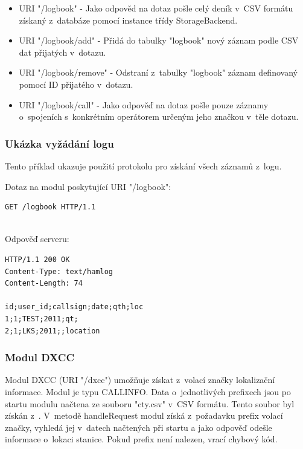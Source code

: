 \begin{itemize}
\item URI "/logbook" - Jako odpověd na dotaz pošle celý deník %
v~CSV formátu získaný z~databáze pomocí instance třídy StorageBackend.
\item URI "/logbook/add" - Přidá do tabulky "logbook" nový záznam podle CSV dat přijatých v~dotazu.
\item URI "/logbook/remove" - Odstraní z~tabulky "logbook" záznam definovaný pomocí ID přijatého v~dotazu.
\item URI "/logbook/call" - Jako odpověď na dotaz pošle pouze záznamy o~spojeních s~konkrétním operátorem určeným jeho značkou
v~těle dotazu.
\end{itemize}

\subsubsection{Ukázka vyžádání logu}

Tento příklad ukazuje použití protokolu pro získání všech záznamů z~logu.

Dotaz na modul poskytující URI "/logbook":
\begin{verbatim}
GET /logbook HTTP/1.1


\end{verbatim}
Odpověď serveru:
\begin{verbatim}
HTTP/1.1 200 OK
Content-Type: text/hamlog
Content-Length: 74

id;user_id;callsign;date;qth;loc
1;1;TEST;2011;qt;
2;1;LKS;2011;;location
\end{verbatim}

\subsubsection{Modul DXCC}

Modul DXCC (URI "/dxcc") umožňuje získat z~volací značky lokalizační informace. Modul je typu CALLINFO.
Data o~jednotlivých prefixech
jsou po startu modulu načtena ze souboru "cty.csv" v~CSV formátu. Tento soubor
byl získán z~\cite{cty.csv}. %
V~metodě handleRequest modul získá z~požadavku prefix volací
značky, vyhledá jej v~datech načtených při startu %
a jako odpověď odešle informace o~lokaci stanice. Pokud prefix není nalezen,
vrací chybový kód.


